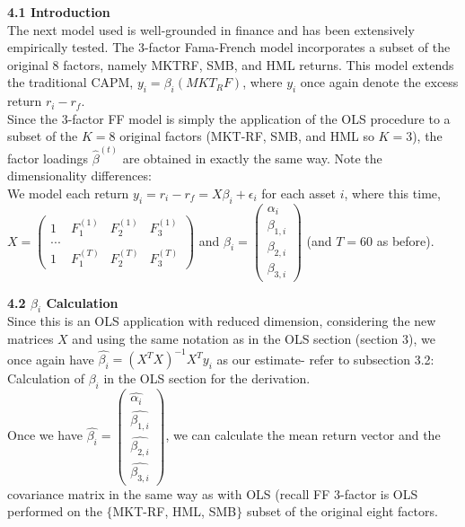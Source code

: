 \documentclass{article}
\begin{document}
\textbf{4.1 Introduction}\\

The next model used is well-grounded in finance and has been extensively empirically tested. The 3-factor Fama-French model incorporates a subset of the original 8 factors, namely MKTRF, SMB, and HML returns. This model extends the traditional CAPM, $y_i = \beta_i(MKT_RF)$, where $y_i$ once again denote the excess return $r_i - r_f$.\\

Since the 3-factor FF model is simply the application of the OLS procedure to a subset of the $K=8$ original factors (MKT-RF, SMB, and HML so $K=3$), the factor loadings $\hat{\beta}^{(t)}$ are obtained in exactly the same way. Note the dimensionality differences:\\

We model each return $y_i = r_i - r_f = X \beta_i + \epsilon_i$ for each asset $i$, where this time, $X = \begin{pmatrix} 1 & F_1^{(1)} & F_2^{(1)} & F_3^{(1)}\\
...\\
1 & F_1^{(T)} & F_2^{(T)} & F_3^{(T)} \end{pmatrix}$ and $\beta_i = \begin{pmatrix} \alpha_i\\
\beta_{1,i}\\
\beta_{2,i}\\
\beta_{3,i} \end{pmatrix}$ (and $T=60$ as before).\\

\vspace{5mm}

\textbf{4.2 $\beta_i$ Calculation}\\

Since this is an OLS application with reduced dimension, considering the new matrices $X$ and using the same notation as in the OLS section (section 3), we once again have $\hat{\beta_i} = (X^TX)^{-1}X^Ty_i$ as our estimate- refer to subsection 3.2: Calculation of $\beta_i$ in the OLS section for the derivation.\\

Once we have $\hat{\beta_i} = \begin{pmatrix} \hat{\alpha_i}\\
\hat{\beta_{1,i}}\\
\hat{\beta_{2,i}}\\
\hat{\beta_{3,i}} \end{pmatrix}$, we can calculate the mean return vector and the covariance matrix in the same way as with OLS (recall FF 3-factor is OLS performed on the $\{$MKT-RF, HML, SMB$\}$ subset of the original eight factors.\\
\end{document}
